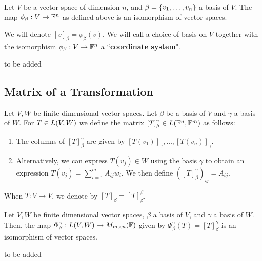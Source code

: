 \documentclass{article}
\begin{document}
\begin{thm}
Let $ V $ be a vector space of dimension $ n $, and $ \beta = \left\{{v_{1}, \dots, v_{n}}\right\} $ a basis of $ V $. The map $ \phi_{\beta}: V \rightarrow \mathbb{F}^{n} $ as defined above is an isomorphism of vector spaces. \npgh

We will denote $ [v]_{\beta} = \phi_{\beta}(v) $. We will call a choice of basis on $ V $ together with the isomorphism $ \phi_{\beta}: V \rightarrow \mathbb{F}^{n} $ a ``\textbf{coordinate system}".
\end{thm}

\begin{pf}[source=Primary Source Material]
to be added
\end{pf}

\subsection{Matrix of a Transformation}

\begin{defn}
Let $ V, W $ be finite dimensional vector spaces. Let $ \beta $ be a basis of $ V $ and $ \gamma $ a basis of $ W $.
For $ T \in \relax{L}(V, W) $ we define the matrix $ [T]_{\beta}^{\gamma} \in \relax{L}(\mathbb{F}^{n}, \mathbb{F}^{m}) $ as follows:
\begin{enumerate}
    \item The columns of $ [T]_{\beta}^{\gamma} $ are given by $ [T(v_{1})]_{\gamma}, \dots, [T(v_{n})]_{\gamma} $.
    \item Alternatively, we can express $ T(v_{j}) \in W $ using the basis $ \gamma $ to obtain an expression $ T(v_{j}) = \sum_{i=1}^{m} {A_{ij}w_{i}} $.
        We then define $ \left( [T]_{\beta}^{\gamma} \right)_{ij} = A_{ij} $.
\end{enumerate}
When $ T:V \rightarrow V $, we denote by $ [T]_{\beta} = [T]_{\beta}^{\beta} $.
\end{defn}

\begin{thm}
Let $ V, W $ be finite dimensional vector spaces, $ \beta $ a basis of $ V $, and $ \gamma $ a basis of $ W $. \vsp
Then, the map $ \Phi_{\beta}^{\gamma} : \relax{L}(V, W) \rightarrow \relax{M}_{m \times n}(\mathbb{F}) $ given by $ \Phi_{\beta}^{\gamma}(T) = [T]_{\beta}^{\gamma} $ is an isomorphism of vector spaces.
\end{thm}

\begin{pf}[source=Primary Source Material]
to be added
\end{pf}
\end{document}
